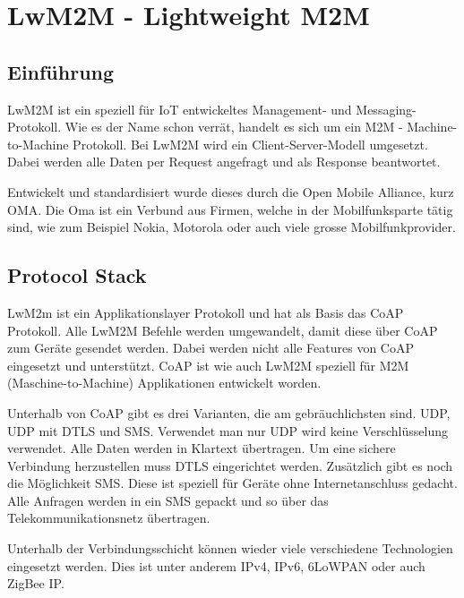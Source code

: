 \section{LwM2M - Lightweight M2M}
\subsection{Einführung}
LwM2M ist ein speziell für IoT entwickeltes Management- und Messaging-Protokoll. Wie es der Name schon verrät, handelt es sich um ein M2M - Machine-to-Machine Protokoll. Bei LwM2M wird ein Client-Server-Modell umgesetzt. Dabei werden alle Daten per Request angefragt und als Response beantwortet.

Entwickelt und standardisiert wurde dieses durch die Open Mobile Alliance, kurz OMA. Die Oma ist ein Verbund aus Firmen, welche in der Mobilfunksparte tätig sind, wie zum Beispiel Nokia, Motorola oder auch viele grosse Mobilfunkprovider. 

\subsection{Protocol Stack}

LwM2m ist ein Applikationslayer Protokoll und hat als Basis das CoAP Protokoll. Alle LwM2M Befehle werden umgewandelt, damit diese über CoAP zum Geräte gesendet werden. Dabei werden nicht alle Features von CoAP eingesetzt und unterstützt. CoAP ist wie auch LwM2M speziell für M2M (Maschine-to-Machine) Applikationen entwickelt worden.

Unterhalb von CoAP gibt es drei Varianten, die am gebräuchlichsten sind. UDP, UDP mit DTLS und SMS. Verwendet man nur UDP wird keine Verschlüsselung verwendet. Alle Daten werden in Klartext übertragen. Um eine sichere Verbindung herzustellen muss DTLS eingerichtet werden. Zusätzlich gibt es noch die Möglichkeit SMS. Diese ist speziell für Geräte ohne Internetanschluss gedacht. Alle Anfragen werden in ein SMS gepackt und so über das Telekommunikationsnetz übertragen.

Unterhalb der Verbindungsschicht können wieder viele verschiedene Technologien eingesetzt werden. Dies ist unter anderem IPv4, IPv6, 6LoWPAN oder auch ZigBee IP. 

